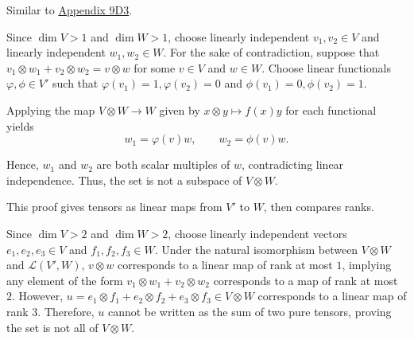
Similar to \hyperref[apex:9d3]{Appendix 9D3}.

\begin{csp}
    Since $\dim V > 1$ and $\dim W > 1$, choose linearly independent $v_1, v_2 \in V$ and linearly independent $w_1, w_2 \in W$. For the sake of contradiction, suppose that $v_1 \otimes w_1 + v_2 \otimes w_2 = v \otimes w$ for some $v \in V$ and $w \in W$. Choose linear functionals $\varphi, \phi \in V'$ such that $\varphi(v_1) = 1, \varphi(v_2) = 0$ and $\phi(v_1) = 0, \phi(v_2) = 1$. 

    Applying the map $V \otimes W \to W$ given by $x \otimes y \mapsto f(x)y$ for each functional yields
    $$w_1 = \varphi(v)w, \qquad w_2 = \phi(v)w.$$

    Hence, $w_1$ and $w_2$ are both scalar multiples of $w$, contradicting linear independence. Thus, the set is not a subspace of $V \otimes W$.
\end{csp}


This proof gives tensors as linear maps from $V'$ to $W$, then compares ranks.

\begin{csp}
    Since $\dim V > 2$ and $\dim W > 2$, choose linearly independent vectors $e_1, e_2, e_3 \in V$ and $f_1, f_2, f_3 \in W$. Under the natural isomorphism between $V \otimes W$ and $\mathcal{L}(V', W)$, $v \otimes w$ corresponds to a linear map of rank at most $1$, implying any element of the form $v_1 \otimes w_1 + v_2 \otimes w_2$ corresponds to a map of rank at most $2$. However, ${u = e_1 \otimes f_1 + e_2 \otimes f_2 + e_3 \otimes f_3 \in V \otimes W}$ corresponds to a linear map of rank $3$. Therefore, $u$ cannot be written as the sum of two pure tensors, proving the set is not all of $V \otimes W$.
\end{csp}